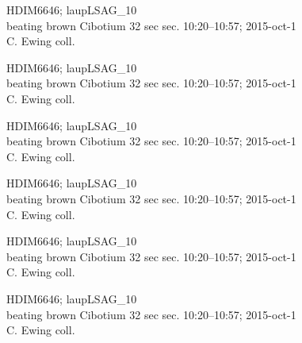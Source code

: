 \documentclass[2pt]{extarticle}
\begin{document}
\noindent
\parbox{0.16\textwidth}{\tiny \raggedright \rule[-0.3\baselineskip]{0pt}{10pt}HDIM6646; laupLSAG\_10\\ beating brown Cibotium 32 sec sec. 10:20--10:57; 2015-oct-1\\ C. Ewing coll.}
\parbox{0.16\textwidth}{\tiny \raggedright \rule[-0.3\baselineskip]{0pt}{10pt}HDIM6646; laupLSAG\_10\\ beating brown Cibotium 32 sec sec. 10:20--10:57; 2015-oct-1\\ C. Ewing coll.}
\parbox{0.16\textwidth}{\tiny \raggedright \rule[-0.3\baselineskip]{0pt}{10pt}HDIM6646; laupLSAG\_10\\ beating brown Cibotium 32 sec sec. 10:20--10:57; 2015-oct-1\\ C. Ewing coll.}
\parbox{0.16\textwidth}{\tiny \raggedright \rule[-0.3\baselineskip]{0pt}{10pt}HDIM6646; laupLSAG\_10\\ beating brown Cibotium 32 sec sec. 10:20--10:57; 2015-oct-1\\ C. Ewing coll.}
\parbox{0.16\textwidth}{\tiny \raggedright \rule[-0.3\baselineskip]{0pt}{10pt}HDIM6646; laupLSAG\_10\\ beating brown Cibotium 32 sec sec. 10:20--10:57; 2015-oct-1\\ C. Ewing coll.}
\parbox{0.16\textwidth}{\tiny \raggedright \rule[-0.3\baselineskip]{0pt}{10pt}HDIM6646; laupLSAG\_10\\ beating brown Cibotium 32 sec sec. 10:20--10:57; 2015-oct-1\\ C. Ewing coll.} \\ 
\vspace{0.001in} 
\end{document}
